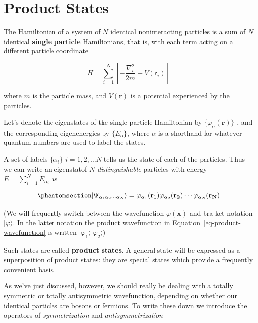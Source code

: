 \documentclass[
  a4paper,
]{scrbook}
\begin{document}
\section{Product States}\label{product-states}

The Hamiltonian of a system of \(N\) identical noninteracting particles
is a sum of \(N\) identical \textbf{single particle} Hamiltonians, that
is, with each term acting on a different particle coordinate

\[
 H = \sum_{i=1}^{N} \left[-\frac{\nabla_i^{2}}{2m}+V(\mathbf{r}_i)\right]
 \label{quantum_statistics_SPHamiltonian}
\]

where \(m\) is the particle mass, and \(V(\mathbf{r})\) is a potential
experienced by the particles.

Let's denote the eigenstates of the single particle Hamiltonian by
\(\{\varphi_\alpha(\mathbf{r})\}\) , and the corresponding eigenenergies
by \(\{E_\alpha\}\), where \(\alpha\) is a shorthand for whatever
quantum numbers are used to label the states.

A set of labels \(\{\alpha_{i}\}\) \(i=1,2,\ldots N\) tells us the state
of each of the particles. Thus we can write an eigenstat\ale of \(N\)
\emph{distinguishable} particles with energy
\(E=\sum_{i=1}^{N}E_{\alpha_{i}}\) as

\begin{equation}\phantomsection\label{eq-distinguishable}{
\lvert{\Psi_{\alpha_{1}\alpha_{2}\cdots \alpha_{N}}}\rangle=\varphi_{\alpha_{1}}(\mathbf{r_{1}})\varphi_{\alpha_{2}}(\mathbf{r_{2}})\cdots\varphi_{\alpha_{N}}(\mathbf{r_{N}})
}\end{equation}

(We will frequently switch between the wavefunction
\(\varphi(\mathbf{x})\) and bra-ket notation \(\lvert{\varphi}\rangle\).
In the latter notation the product wavefunction in
Equation~\ref{eq-product-wavefunction} is written
\(\lvert{\varphi_{1}}\rangle\lvert{\varphi_{2}}\rangle\))

Such states are called \textbf{product states}. A general state will be
expressed as a superposition of product states: they are special states
which provide a frequently convenient basis.

As we've just discussed, however, we should really be dealing with a
totally symmetric or totally antisymmetric wavefunction, depending on
whether our identical particles are bosons or fermions. To write these
down we introduce the operators of \emph{symmetrization} and
\emph{antisymmetrization}
\end{document}

